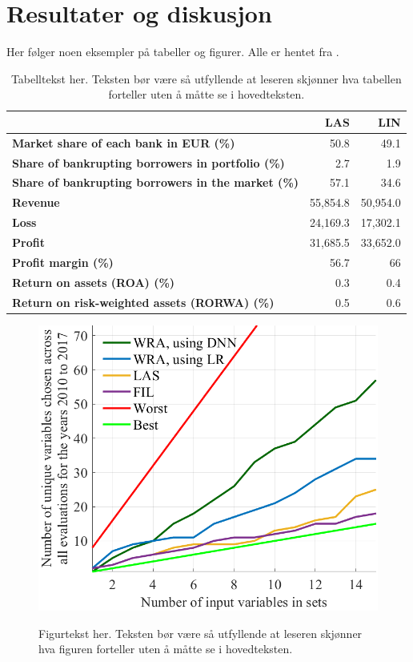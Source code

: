\chapter{Resultater og diskusjon}

Her følger noen eksempler på tabeller og figurer. Alle er hentet fra \cite{paraschiv_bankruptcy_2021}.

\begin{table}[h]
  \centering
{}\label{tab:simulation_1:industry}
    \begin{tabular}{l|rr}
    \hline\hline
          & \textbf{LAS} & \textbf{LIN}  \\
          \hline
    \textbf{Market share of each bank in EUR (\%)} &  50.8  &  49.1   \\
    \textbf{Share of bankrupting borrowers in portfolio (\%)} &  2.7  & 1.9  \\
    \textbf{Share of bankrupting borrowers in the market (\%)} & 57.1  &    34.6  \\
    \textbf{Revenue} &    55,854.8  &    50,954.0 \\
    \textbf{Loss} &    24,169.3  &    17,302.1   \\
    \textbf{Profit} &    31,685.5  &    33,652.0   \\
    \textbf{Profit margin (\%)} & 56.7  & 66     \\
    \textbf{Return on assets (ROA) (\%)} & 0.3   & 0.4    \\
    \textbf{Return on risk-weighted assets (RORWA) (\%)} & 0.5   & 0.6   \\
    \hline\hline
    \end{tabular}
  \caption*{Tabelltekst her. Teksten bør være så utfyllende at leseren skjønner hva tabellen forteller uten å måtte se i hovedteksten.}
\end{table}



\begin{figure}[h]
\label{fig:number of unique input variables}
	\centering
	\includegraphics[width=0.49\linewidth]{images/unique_input_variables.png}
 	\caption*{Figurtekst her. Teksten bør være så utfyllende at leseren skjønner hva figuren forteller uten å måtte se i hovedteksten.}
\end{figure}


